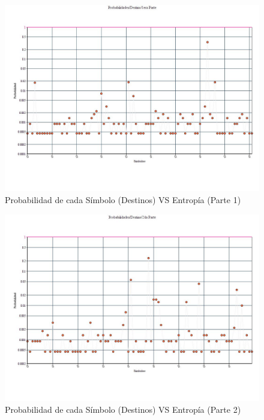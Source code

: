\newpage

\begin{figure}[H]
  \centering
    \includegraphics[scale=0.45]{imagenes/graficos/Probabilidades/02destino1eraParte.jpg}
  \caption{Probabilidad de cada Símbolo (Destinos) VS Entropía (Parte 1)}
  \label{fig:ejemplo}
\end{figure}

\begin{figure}[H]
  \centering
    \includegraphics[scale=0.45]{imagenes/graficos/Probabilidades/02destino2daParte.jpg}
  \caption{Probabilidad de cada Símbolo (Destinos) VS Entropía (Parte 2)}
  \label{fig:ejemplo}
\end{figure}

\newpage

